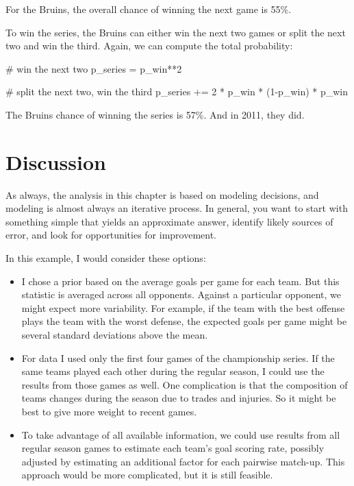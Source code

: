 \documentclass[12pt]{book}
\theoremstyle{exercise}
\begin{document}
For the Bruins, the overall chance of winning the next game is 55\%.

To win the series, the Bruins can either win the next two games
or split the next two and win the third.  Again, we can compute
the total probability:

\begin{code}
    # win the next two
    p_series = p_win**2

    # split the next two, win the third
    p_series += 2 * p_win * (1-p_win) * p_win
\end{code}  

The Bruins chance of winning the series is 57\%.  And in 2011,
they did.


\section{Discussion}

As always, the analysis in this chapter is based on modeling decisions,
and modeling is almost always an iterative process.  In general,
you want to start with something simple that yields an approximate
answer, identify likely sources of error, and look for opportunities
for improvement.

In this example, I would consider these options:

\begin{itemize}

\item I chose a prior based on the average goals per game for each
  team.  But this statistic is averaged across all opponents.  Against
  a particular opponent, we might expect more variability.  For
  example, if the team with the best offense plays the team with the
  worst defense, the expected goals per game might be several standard
  deviations above the mean.

\item For data I used only the first four games of the championship
  series.  If the same teams played each other during the
  regular season, I could use the results from those games as well.
  One complication is that the composition of teams changes during
  the season due to trades and injuries.  So it might be best to
  give more weight to recent games.

\item To take advantage of all available information, we could
  use results from all regular season games to estimate each team's
  goal scoring rate, possibly adjusted by estimating
  an additional factor for each pairwise match-up.  This approach
  would be more complicated, but it is still feasible.

\end{itemize}
\end{document}
